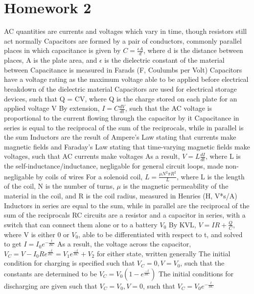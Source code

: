 \documentclass[11 pt, twoside]{article}
\newenvironment{outline*}
{
	\begin{outline}[enumerate]
	}
	{\end{outline}
}
\begin{document}
\section{Homework 2}
\begin{outline*}
\1 AC quantities are currents and voltages which vary in time, though resistors still act normally
\1 Capacitors are formed by a pair of conductors, commonly parallel places in which capacitance is given by $C = \frac{\epsilon A}{d}$, where d is the distance between places, A is the plate area, and $\epsilon$ is the dielectric constant of the material between
	\2 Capacitance is measured in Farads (F, Coulumbs per Volt)
	\2 Capacitors have a voltage rating as the maximum voltage able to be applied before electrical breakdown of the dielectric material
	\2 Capacitors are used for electrical storage devices, such that Q = CV, where Q is the charge stored on each plate for an applied voltage V
		\3 By extension, $I = C\frac{dV}{dt}$, such that the AC voltage is proportional to the current flowing through the capacitor by it
	\2 Capacitance in series is equal to the reciprocal of the sum of the reciprocals, while in parallel is the sum
\1 Inductors are the result of Ampere's Law stating that currents make magnetic fields and Faraday's Law stating that time-varying magnetic fields make voltages, such that AC currents make voltages
	\2 As a result, $V = L\frac{dI}{dt}$, where L is the self-inductance/inductance, negligable for general circuit loops, made non-negligable by coils of wires
	\2 For a solenoid coil, $L = \frac{\mu N^2 \pi R^2}{L}$, where L is the length of the coil, N is the number of turns, $\mu$ is the magnetic permeability of the material in the coil, and R is the coil radius, measured in Henries (H, V*s/A)
	\2 Inductors in series are equal to the sum, while in parallel are the reciprocal of the sum of the reciprocals
\1 RC circuits are a resistor and a capacitor in series, with a switch that can connect them alone or to a battery $V_0$
	\2 By KVL, $V = IR + \frac{Q}{C}$, where V is either 0 or $V_0$, able to be differentiated with respect to t, and solved to get $I = I_0e^{-\frac{t}{RC}}$
		\3 As a result, the voltage across the capacitor, $V_C = V - I_0Re^{\frac{-t}{RC}} = V_1e^{\frac{-t}{RC}} + V_2$ for either state, written generally
	\2 The initial condition for charging is specified such that $V_C = 0, V = V_0$, such that the constants are determined to be $V_C = V_0(1 - e^{\frac{-t}{RC}})$
	\2 The initial conditions for discharging are given such that $V_C = V_0, V = 0$, such that $V_C = V_0e^{-\frac{t}{RC}}$

\end{outline*}
\end{document}
